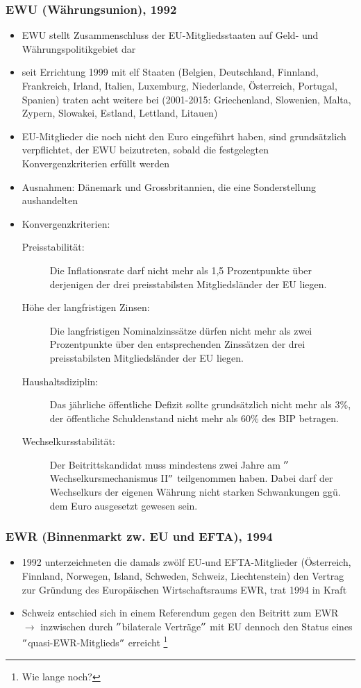 \subsubsection{EWU (Währungsunion), 1992}
\label{sec:EWU}
\begin{itemize}
	\item EWU stellt Zusammenschluss der EU-Mitgliedsstaaten auf Geld- und Währungspolitikgebiet dar
	\item seit Errichtung 1999 mit elf Staaten (Belgien, Deutschland, Finnland, Frankreich, Irland, Italien, Luxemburg, Niederlande, Österreich, Portugal, Spanien) traten acht weitere bei (2001-2015: Griechenland, Slowenien, Malta, Zypern, Slowakei, Estland, Lettland, Litauen)
	\item EU-Mitglieder die noch nicht den Euro eingeführt haben, sind grundsätzlich verpflichtet, der EWU beizutreten, sobald die festgelegten Konvergenzkriterien erfüllt werden
	\item Ausnahmen: Dänemark und Grossbritannien, die eine Sonderstellung aushandelten
	\item Konvergenzkriterien:
	\begin{description}
		\item[Preisstabilität:] Die Inflationsrate darf nicht mehr als 1,5 Prozentpunkte über derjenigen der drei preisstabilsten Mitgliedsländer der EU liegen.
		\item[Höhe der langfristigen Zinsen:] Die langfristigen Nominalzinssätze dürfen nicht mehr als zwei Prozentpunkte über den entsprechenden Zinssätzen der drei preisstabilsten Mitgliedsländer der EU liegen.
		\item[Haushaltsdiziplin:] Das jährliche öffentliche Defizit sollte grundsätzlich nicht mehr als 3\%, der öffentliche Schuldenstand nicht mehr als 60\% des BIP betragen.
		\item[Wechselkursstabilität:] Der Beitrittskandidat muss mindestens zwei Jahre am $"$Wechselkursmechanismus II$"$ teilgenommen haben. Dabei darf der Wechselkurs der eigenen Währung nicht starken Schwankungen ggü. dem Euro ausgesetzt gewesen sein.
	\end{description}
\end{itemize}
\clearpage

\subsubsection{EWR (Binnenmarkt zw. EU und EFTA), 1994}
\begin{itemize}
	\item 1992 unterzeichneten die damals zwölf EU-und EFTA-Mitglieder (Österreich, Finnland, Norwegen, Island, Schweden, Schweiz, Liechtenstein) den Vertrag zur Gründung des Europäischen Wirtschaftsraums EWR, trat 1994 in Kraft
	\item Schweiz entschied sich in einem Referendum gegen den Beitritt zum EWR $\rightarrow$ inzwischen durch $"$bilaterale Verträge$"$ mit EU dennoch den Status eines $"$quasi-EWR-Mitglieds$"$ erreicht \footnote{Wie lange noch?}
\end{itemize}

